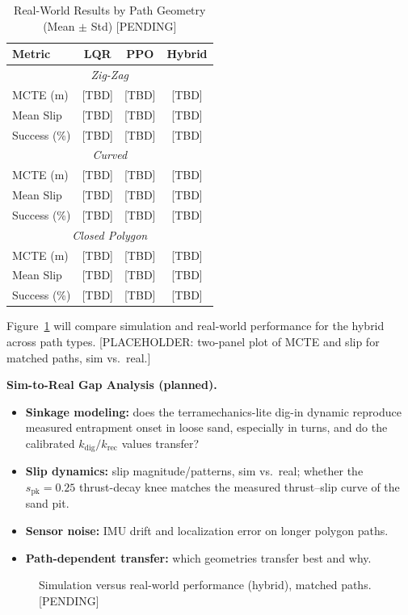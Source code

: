 \documentclass[conference]{IEEEtran}
\begin{document}
\begin{table}[t]
\centering
\caption{Real-World Results by Path Geometry (Mean $\pm$ Std) [PENDING]}
\label{tab:real_results}
{\footnotesize
\setlength{\tabcolsep}{4pt}
\begin{tabular}{@{}lccc@{}}
\toprule
\textbf{Metric} & \textbf{LQR} & \textbf{PPO} & \textbf{Hybrid} \\
\midrule
\multicolumn{4}{c}{\textit{Zig-Zag}} \\
MCTE (m) & [TBD] & [TBD] & [TBD] \\
Mean Slip & [TBD] & [TBD] & [TBD] \\
Success (\%) & [TBD] & [TBD] & [TBD] \\
\midrule
\multicolumn{4}{c}{\textit{Curved}} \\
MCTE (m) & [TBD] & [TBD] & [TBD] \\
Mean Slip & [TBD] & [TBD] & [TBD] \\
Success (\%) & [TBD] & [TBD] & [TBD] \\
\midrule
\multicolumn{4}{c}{\textit{Closed Polygon}} \\
MCTE (m) & [TBD] & [TBD] & [TBD] \\
Mean Slip & [TBD] & [TBD] & [TBD] \\
Success (\%) & [TBD] & [TBD] & [TBD] \\
\bottomrule
\end{tabular}
}
\end{table}

Figure~\ref{fig:sim2real} will compare simulation and real-world performance for the hybrid across path types. [PLACEHOLDER: two-panel plot of MCTE and slip for matched paths, sim vs.\ real.]

\noindent\textbf{Sim-to-Real Gap Analysis (planned).}
\begin{itemize}
\item \textbf{Sinkage modeling:} does the terramechanics-lite dig-in dynamic reproduce measured entrapment onset in loose sand, especially in turns, and do the calibrated $k_{\text{dig}}/k_{\text{rec}}$ values transfer?
\item \textbf{Slip dynamics:} slip magnitude/patterns, sim vs.\ real; whether the $s_{\text{pk}}=0.25$ thrust-decay knee matches the measured thrust--slip curve of the sand pit.
\item \textbf{Sensor noise:} IMU drift and localization error on longer polygon paths.
\item \textbf{Path-dependent transfer:} which geometries transfer best and why.
\end{itemize}
\begin{figure}[t]
\centering
{}
\caption{Simulation versus real-world performance (hybrid), matched paths. [PENDING]}
\label{fig:sim2real}
\end{figure}
\end{document}
